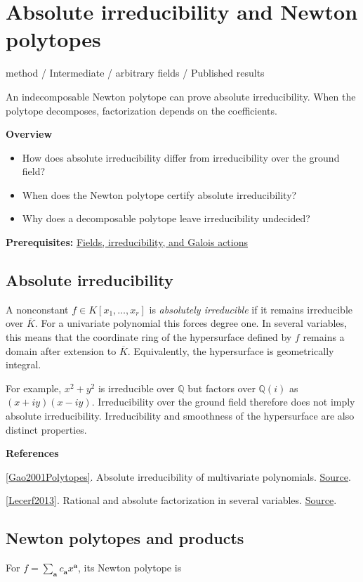 \documentclass[11pt,a4paper,oneside,openany]{book}
\newenvironment{sources}{\par\smallskip\begingroup\footnotesize\color{atlasgray}\leftskip=10pt\setlength{\parskip}{2pt}}{\par\endgroup\smallskip}
\begin{document}
\chapter{Absolute irreducibility and Newton polytopes}\label{article:multivariate-irreducibility}\hypertarget{article:multivariate-irreducibility}{}\color{black}
{\sffamily\small\color{atlasgold}method / Intermediate / arbitrary fields / Published results}\par\medskip
An indecomposable Newton polytope can prove absolute irreducibility. When the polytope decomposes, factorization depends on the coefficients.\par\medskip
\textbf{Overview}\begin{itemize}
\item How does absolute irreducibility differ from irreducibility over the ground field?
\item When does the Newton polytope certify absolute irreducibility?
\item Why does a decomposable polytope leave irreducibility undecided?
\end{itemize}
{\small\textbf{Prerequisites:} \hyperlink{article:foundations}{Fields, irreducibility, and Galois actions}}\par
{}\section{Absolute irreducibility}
\color{black} A nonconstant \(f\in K[x_1,\ldots,x_r]\) is \emph{absolutely irreducible} if it remains irreducible over \(\overline K\). For a univariate polynomial this forces degree one. In several variables, this means that the coordinate ring of the hypersurface defined by \(f\) remains a domain after extension to \(\overline K\). Equivalently, the hypersurface is geometrically integral.\par
\color{black} For example, \(x^2+y^2\) is irreducible over \(\mathbb Q\) but factors over \(\mathbb Q(i)\) as \((x+iy)(x-iy)\). Irreducibility over the ground field therefore does not imply absolute irreducibility. Irreducibility and smoothness of the hypersurface are also distinct properties.\par
\begin{sources}
\textbf{References}\par\smallskip
\noindent\hyperlink{ref:Gao2001Polytopes}{[Gao2001Polytopes]}. Absolute irreducibility of multivariate polynomials. \href{https://www.sciencedirect.com/science/article/pii/S0021869300985867}{Source}.\par
\noindent\hyperlink{ref:Lecerf2013}{[Lecerf2013]}. Rational and absolute factorization in several variables. \href{https://www.numdam.org/articles/10.5802/ccirm.18/}{Source}.\par
\end{sources}\color{black}
\section{Newton polytopes and products}
\color{black} For \(f=\sum_{\mathbf a}c_{\mathbf a}x^{\mathbf a}\), its Newton polytope is\par
\end{document}
